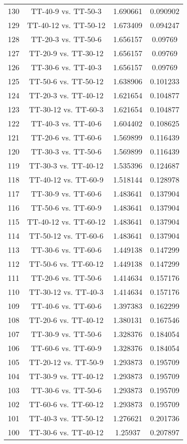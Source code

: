 \documentclass[a4paper,10pt]{article}
\begin{document}
\begin{landscape}
\begin{table}[!htp]
\begin{tabular}{cccc}
130&TT-40-9 vs. TT-50-3&1.690661&0.090902\\
129&TT-40-12 vs. TT-50-12&1.673409&0.094247\\
128&TT-20-3 vs. TT-50-6&1.656157&0.09769\\
127&TT-20-9 vs. TT-30-12&1.656157&0.09769\\
126&TT-30-6 vs. TT-40-3&1.656157&0.09769\\
125&TT-50-6 vs. TT-50-12&1.638906&0.101233\\
124&TT-20-3 vs. TT-40-12&1.621654&0.104877\\
123&TT-30-12 vs. TT-60-3&1.621654&0.104877\\
122&TT-40-3 vs. TT-40-6&1.604402&0.108625\\
121&TT-20-6 vs. TT-60-6&1.569899&0.116439\\
120&TT-30-3 vs. TT-50-6&1.569899&0.116439\\
119&TT-30-3 vs. TT-40-12&1.535396&0.124687\\
118&TT-40-12 vs. TT-60-9&1.518144&0.128978\\
117&TT-30-9 vs. TT-60-6&1.483641&0.137904\\
116&TT-50-6 vs. TT-60-9&1.483641&0.137904\\
115&TT-40-12 vs. TT-60-12&1.483641&0.137904\\
114&TT-50-12 vs. TT-60-6&1.483641&0.137904\\
113&TT-30-6 vs. TT-60-6&1.449138&0.147299\\
112&TT-50-6 vs. TT-60-12&1.449138&0.147299\\
111&TT-20-6 vs. TT-50-6&1.414634&0.157176\\
110&TT-30-12 vs. TT-40-3&1.414634&0.157176\\
109&TT-40-6 vs. TT-60-6&1.397383&0.162299\\
108&TT-20-6 vs. TT-40-12&1.380131&0.167546\\
107&TT-30-9 vs. TT-50-6&1.328376&0.184054\\
106&TT-60-6 vs. TT-60-9&1.328376&0.184054\\
105&TT-20-12 vs. TT-50-9&1.293873&0.195709\\
104&TT-30-9 vs. TT-40-12&1.293873&0.195709\\
103&TT-30-6 vs. TT-50-6&1.293873&0.195709\\
102&TT-60-6 vs. TT-60-12&1.293873&0.195709\\
101&TT-40-3 vs. TT-50-12&1.276621&0.201736\\
100&TT-30-6 vs. TT-40-12&1.25937&0.207897\\

\end{tabular}
\end{table}
\end{landscape}
\end{document}

